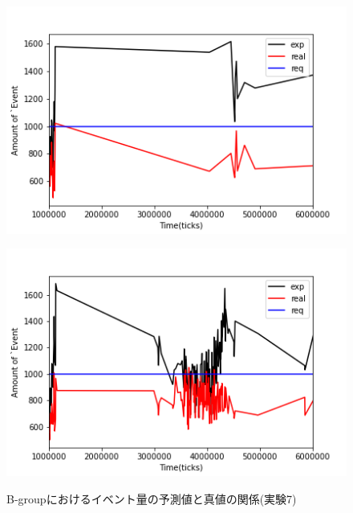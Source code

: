 \documentclass[12pt,a4j,twoside]{jarticle}
\begin{document}
  \begin{figure}
    \begin{minipage}{0.48\hsize}
      \centering
      \includegraphics[width=0.99\hsize]{figures/ExpReal_Office_Bgroup_2.png}
      \label{subfig:expReal_Office_B_2}
    \end{minipage}
    \hfill
    \begin{minipage}{0.48\hsize}
      \centering
      \includegraphics[width=0.99\hsize]{figures/ExpReal_Office_Bgroup_6.png}
      \label{subfig:expReal_Office_B_6}
    \end{minipage}
    \caption{B-groupにおけるイベント量の予測値と真値の関係(実験7)}
    \label{fig:expReal_Office_B}
  \end{figure}
\end{document}
